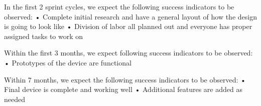 In the first 2 sprint cycles, we expect the following success indicators to be observed:
•	Complete initial research and have a general layout of how the design is going to look like
•	Division of labor all planned out and everyone has proper assigned tasks to work on

Within the first 3 months, we expect following success indicators to be observed:
•	Prototypes of the device are functional

Within 7 months, we expect the following success indicators to be observed:
•	Final device is complete and working well
•	Additional features are added as needed
